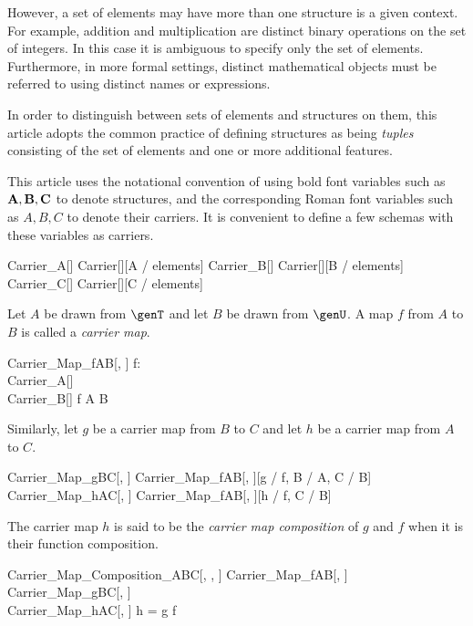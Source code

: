 \documentclass{amsart}
\begin{document}
However, a set of elements may have more than one structure is a given context.
For example, addition and multiplication are distinct binary operations on the set of integers.
In this case it is ambiguous to specify only the set of elements.
Furthermore, in more formal settings, distinct mathematical objects
must be referred to using distinct names or expressions.

In order to distinguish between sets of elements and structures on them, 
this article adopts the common practice of defining structures as being \textit{tuples}
consisting of the set of elements and one or more additional features.

This article uses the notational convention of using bold font variables such as $\mathbf{A}, \mathbf{B}, \mathbf{C}$
to denote structures, and the corresponding Roman font variables such as $A, B, C$ to denote their carriers.
It is convenient to define a few schemas with these variables as carriers.
\begin{zed}
	Carrier\_A[\genT]  Carrier[\genT][A / elements]
\also
	Carrier\_B[\genT]  Carrier[\genT][B / elements]
\also
	Carrier\_C[\genT]  Carrier[\genT][C / elements]
\end{zed}

Let $A$ be drawn from $\genT$ and let $B$ be drawn from $\genU$.
A map $f$ from $A$ to $B$ is called a \textit{carrier map}.
\begin{schema}{Carrier\_Map\_fAB}[\genT, \genU]
	f: \genT \pfun \genU \\
	Carrier\_A[\genT] \\
	Carrier\_B[\genU]
\where
	f \in A \fun B
\end{schema}

Similarly, let $g$ be a carrier map from $B$ to $C$ and
let $h$ be a carrier map from $A$ to $C$.
\begin{zed}
	Carrier\_Map\_gBC[\genT, \genU]  Carrier\_Map\_fAB[\genT, \genU][g / f, B / A, C / B]
\also
	Carrier\_Map\_hAC[\genT, \genU]  Carrier\_Map\_fAB[\genT, \genU][h / f, C / B]
\end{zed}

The carrier map $h$ is said to be the \textit{carrier map composition} of $g$ and $f$ when
it is their function composition.
\begin{schema}{Carrier\_Map\_Composition\_ABC}[\genT, \genU, \genV]
	Carrier\_Map\_fAB[\genT, \genU] \\
	Carrier\_Map\_gBC[\genU, \genV] \\
	Carrier\_Map\_hAC[\genT, \genV]
\where
	h = g \circ f
\end{schema}
\end{document}

